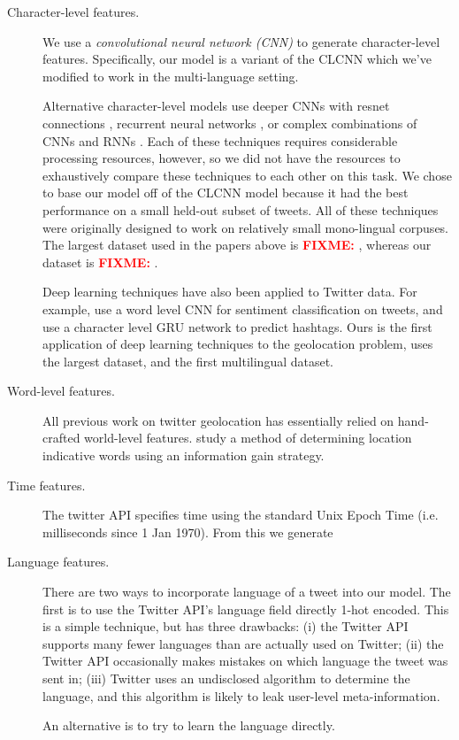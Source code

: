\documentclass[sigconf,10pt]{acmart}
\newcommand{\defn}[1]{\textit{#1}}
\newcommand{\fixme}[1]{\textcolor{red}{\textbf{FIXME:} {#1}}}
\begin{document}
\begin{description}
\item[Character-level features.]
We use a \defn{convolutional neural network (CNN)} to generate character-level features.
Specifically, our model is a variant of the CLCNN \citep{zhang2015character} which we've modified to work in the multi-language setting.

Alternative character-level models use deeper CNNs with resnet connections \citep{conneau2017very}, recurrent neural networks \citep{chung2016character}, or complex combinations of CNNs and RNNs \citep{kim2016character,jozefowicz2016exploring}.
Each of these techniques requires considerable processing resources, however, 
so we did not have the resources to exhaustively compare these techniques to each other on this task.
We chose to base our model off of the CLCNN model because it had the best performance on a small held-out subset of tweets.
All of these techniques were originally designed to work on relatively small mono-lingual corpuses.
The largest dataset used in the papers above is \fixme{},
whereas our dataset is \fixme{}.

Deep learning techniques have also been applied to Twitter data.
For example, 
\citet{severyn2015unitn} use a word level CNN for sentiment classification on tweets,
and \citet{dhingra2016tweet2vec} use a character level GRU network to predict hashtags.
Ours is the first application of deep learning techniques to the geolocation problem,
uses the largest dataset,
and the first multilingual dataset.

\item[Word-level features.]
All previous work on twitter geolocation has essentially relied on hand-crafted world-level features.
\citet{han2012geolocation} study a method of determining location indicative words using an information gain strategy.

\item[Time features.]
The twitter API specifies time using the standard Unix Epoch Time 
(i.e. milliseconds since 1 Jan 1970).
From this we generate 

\item[Language features.]
There are two ways to incorporate language of a tweet into our model.
The first is to use the Twitter API's language field directly 1-hot encoded.
This is a simple technique, but has three drawbacks:
(i) the Twitter API supports many fewer languages than are actually used on Twitter;
(ii) the Twitter API occasionally makes mistakes on which language the tweet was sent in;
(iii) Twitter uses an undisclosed algorithm to determine the language,
and this algorithm is likely to leak user-level meta-information.

An alternative is to try to learn the language directly.

\end{description}
\end{document}
